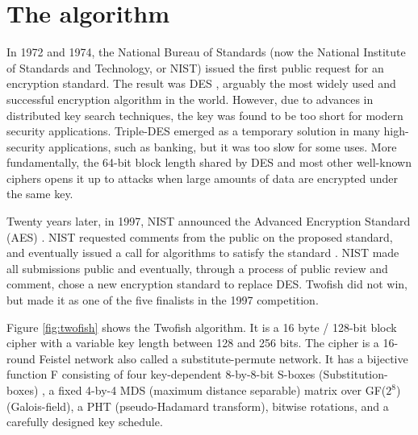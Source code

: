\section{The algorithm}
In 1972 and 1974, the National Bureau of Standards (now the National Institute of Standards and Technology, or NIST) issued the first public request for an encryption standard. The result was DES \cite{NBS77}, arguably the most widely used and successful encryption algorithm in the world. However, due to advances in distributed key search techniques, the key was found to be too short for modern security applications.
Triple-DES emerged as a temporary solution in many high-security applications, such as banking, but it was too slow for some uses. More fundamentally, the 64-bit block length shared by DES and most other well-known ciphers opens it up to attacks when large amounts of data are encrypted under the same key.

Twenty years later, in 1997, NIST announced the Advanced Encryption Standard (AES) \cite{NIST97a}. NIST requested comments from the public on the proposed standard, and eventually issued a call for algorithms to satisfy the standard \cite{NIST97b}. NIST made all submissions public and eventually, through a process of public review and comment, chose a new encryption standard to replace DES. Twofish did not win, but made it as one of the five finalists in the 1997 competition.

Figure \ref{fig:twofish} shows the Twofish algorithm. It is a 16 byte / 128-bit block cipher with a variable key length between 128 and 256 bits. The cipher is a 16-round Feistel network also called a substitute-permute network. It has a bijective function F consisting of four key-dependent 8-by-8-bit S-boxes (Substitution-boxes) \cite{wiki_sbox}, a fixed 4-by-4 MDS (maximum distance separable) matrix over GF($2^8$) (Galois-field), a PHT (pseudo-Hadamard transform), bitwise rotations, and a carefully designed key schedule.


